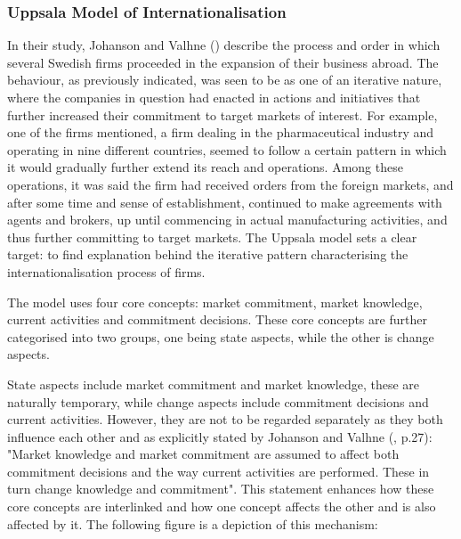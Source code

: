 \documentclass[11pt,a4paper]{article}
\begin{document}
\subsubsection{Uppsala Model of Internationalisation}
\label{uppsala_frame}
  \vspace{-1mm}
\par
In their study, Johanson and Valhne (\citeyear{johansonInternationalizationProcessFirm1977}) describe the process and order in which several Swedish firms proceeded in the expansion of their business abroad. The behaviour, as previously indicated, was seen to be as one of an iterative nature, where the companies in question had enacted in actions and initiatives that further increased their commitment to target markets of interest. For example, one of the firms mentioned, a firm dealing in the pharmaceutical industry and operating in nine different countries, seemed to follow a certain pattern in which it would gradually further extend its reach and operations. Among these operations, it was said the firm had received orders from the foreign markets, and after some time and sense of establishment, continued to make agreements with agents and brokers, up until commencing in actual manufacturing activities, and thus further committing to target markets. The Uppsala model sets a clear target: to find explanation behind the iterative pattern characterising the internationalisation process of firms. \par
The model uses four core concepts: market commitment, market knowledge, current activities and commitment decisions. These core concepts are further categorised into two groups, one being state aspects, while the other is change aspects. \par
State aspects include market commitment and market knowledge, these are naturally temporary, while change aspects include commitment decisions and current activities. However, they are not to be regarded separately as they both influence each other and as explicitly stated by Johanson and Valhne (\citeyear{johansonInternationalizationProcessFirm1977}, p.27): "Market knowledge and market commitment are assumed to affect both commitment decisions and
the way current activities are performed. These in turn change knowledge and commitment". This statement enhances how these core concepts are interlinked and how one concept affects the other and is also affected by it.  The following figure is a depiction of this mechanism: 
\newpage
\end{document}
